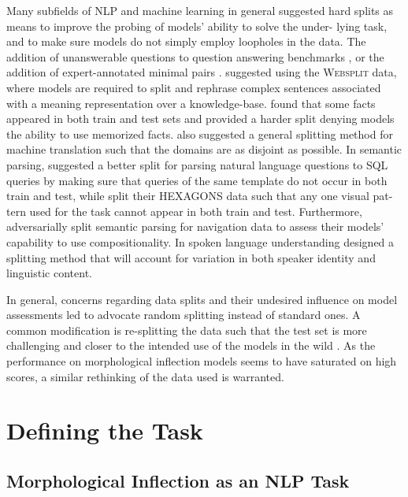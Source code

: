 \documentclass[11pt]{article}
\begin{document}
Many subfields of NLP and machine learning in general suggested hard splits as means to improve the probing of models’ ability to solve the under- lying task, and to make sure models do not simply employ loopholes in the data.
The addition of unanswerable questions to question answering benchmarks \citep{rajpurkar-etal-2018-know}, or the addition of expert-annotated minimal pairs \citep{gardner-etal-2020-evaluating}. 
\citet{narayan-etal-2017-split} suggested using the \textsc{Websplit} data, where models are required to split and rephrase complex sentences associated with a meaning representation over a knowledge-base. 
\citet{aharoni-goldberg-2018-split} found that some facts appeared in both train and test sets and provided a harder split denying models the ability to use memorized facts. \citet{aharoni-goldberg-2020-unsupervised} also suggested a general splitting method for machine translation such that the domains are as disjoint as possible.
In semantic parsing, \citet{finegan-dollak-etal-2018-improving} suggested a better split for parsing natural language questions to SQL queries by making sure that queries of the same template do not occur in both train and test, while \citet{lachmy2022} split their HEXAGONS data such that any one visual pat- tern used for the task cannot appear in both train and test. 
Furthermore, \citet{loula-etal-2018-rearranging} adversarially split semantic parsing for navigation data to assess their models’ capability to use compositionality. In spoken language understanding \citet{arora2021} designed a splitting method that will account for variation in both speaker identity and linguistic content.



In general, concerns regarding data splits and their undesired influence on model assessments led \citet{gorman-bedrick-2019-need} to advocate random splitting instead of standard ones.
A common modification is re-splitting the data such that the test set is more challenging and closer to the intended use of the models in the wild \citep{sogaard-etal-2021-need}. As the performance on morphological inflection models seems to have saturated on high scores, a similar rethinking of the data used is warranted.

\newpage
\section{Defining the Task}
\subsection{Morphological Inflection as an NLP Task}
\end{document}
